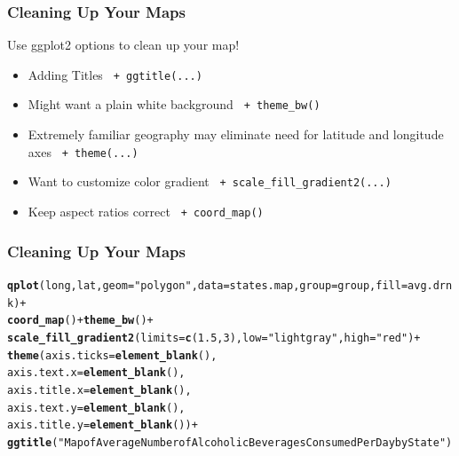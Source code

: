 \documentclass{beamer}\usepackage[]{graphicx}\usepackage[]{color}
\makeatletter
\newcommand{\hlnum}[1]{\textcolor[rgb]{0.686,0.059,0.569}{#1}}%
\newcommand{\hlstr}[1]{\textcolor[rgb]{0.192,0.494,0.8}{#1}}%
\newcommand{\hlopt}[1]{\textcolor[rgb]{0,0,0}{#1}}%
\newcommand{\hlstd}[1]{\textcolor[rgb]{0.345,0.345,0.345}{#1}}%
\newcommand{\hlkwc}[1]{\textcolor[rgb]{0.333,0.667,0.333}{#1}}%
\newcommand{\hlkwd}[1]{\textcolor[rgb]{0.737,0.353,0.396}{\textbf{#1}}}%
\newenvironment{kframe}{%
 \def\at@end@of@kframe{}%
 \ifinner\ifhmode%
  \def\at@end@of@kframe{\end{minipage}}%
  \begin{minipage}{\columnwidth}%
 \fi\fi%
 \def\FrameCommand##1{\hskip\@totalleftmargin \hskip-\fboxsep
 \colorbox{shadecolor}{##1}\hskip-\fboxsep
     \hskip-\linewidth \hskip-\@totalleftmargin \hskip\columnwidth}%
 \MakeFramed {\advance\hsize-\width
   \@totalleftmargin\z@ \linewidth\hsize
   \@setminipage}}%
 {\par\unskip\endMakeFramed%
 \at@end@of@kframe}
\newenvironment{knitrout}{}{} %
\makeatother
\begin{document}
\begin{frame}
    \frametitle{Cleaning Up Your Maps}
   Use ggplot2 options to clean up your map!
    \begin{itemize}
      \item Adding Titles \texttt{ + ggtitle(...)}
      \item Might want a plain white background \texttt{ + theme\_bw()}
      \item Extremely familiar geography may eliminate need for latitude and longitude axes \texttt{ + theme(...)}
      \item Want to customize color gradient   \texttt{ + scale\_fill\_gradient2(...) }
      \item Keep aspect ratios correct   \texttt{ + coord\_map() }
    \end{itemize}    
\end{frame}




\begin{frame}[fragile]
    \frametitle{Cleaning Up Your Maps}

\begin{knitrout}\footnotesize
{}\color{fgcolor}\begin{kframe}
\begin{alltt}
\hlkwd{qplot}\hlstd{(long, lat,} \hlkwc{geom}\hlstd{=}\hlstr{"polygon"}\hlstd{,} \hlkwc{data}\hlstd{=states.map,} \hlkwc{group}\hlstd{=group,} \hlkwc{fill}\hlstd{=avg.drnk)} \hlopt{+}
  \hlkwd{coord_map}\hlstd{()} \hlopt{+}  \hlkwd{theme_bw}\hlstd{()} \hlopt{+}
  \hlkwd{scale_fill_gradient2}\hlstd{(}\hlkwc{limits}\hlstd{=}\hlkwd{c}\hlstd{(}\hlnum{1.5}\hlstd{,} \hlnum{3}\hlstd{),}\hlkwc{low}\hlstd{=}\hlstr{"lightgray"}\hlstd{,}\hlkwc{high}\hlstd{=}\hlstr{"red"}\hlstd{)} \hlopt{+}
  \hlkwd{theme}\hlstd{(}\hlkwc{axis.ticks} \hlstd{=} \hlkwd{element_blank}\hlstd{(),}
       \hlkwc{axis.text.x} \hlstd{=} \hlkwd{element_blank}\hlstd{(),}
       \hlkwc{axis.title.x}\hlstd{=}\hlkwd{element_blank}\hlstd{(),}
       \hlkwc{axis.text.y} \hlstd{=} \hlkwd{element_blank}\hlstd{(),}
       \hlkwc{axis.title.y}\hlstd{=}\hlkwd{element_blank}\hlstd{())} \hlopt{+}
  \hlkwd{ggtitle}\hlstd{(}\hlstr{"Map of Average Number of Alcoholic Beverages Consumed Per Day by State"}\hlstd{)}
\end{alltt}
\end{kframe}
\end{knitrout}
\end{frame}
 
\end{document}
